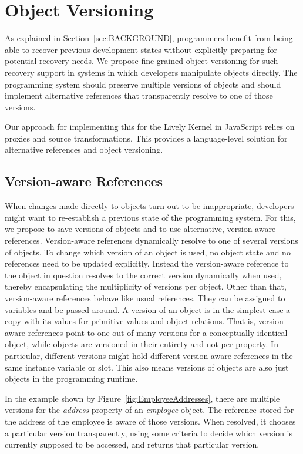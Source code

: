 \chapter{Object Versioning} \label{sec:APPROACH}

As explained in Section~\ref{sec:BACKGROUND}, programmers benefit from being able to recover previous development states without explicitly preparing for potential recovery needs.
We propose fine-grained object versioning for such recovery support in systems in which developers manipulate objects directly.
The programming system should preserve multiple versions of objects and should implement alternative references that transparently resolve to one of those versions.

Our approach for implementing this for the Lively Kernel in JavaScript relies on proxies and source transformations.
This provides a language-level solution for alternative references and object versioning.

\section{Version-aware References}

When changes made directly to objects turn out to be inappropriate, developers might want to re-establish a previous state of the programming system.
For this, we propose to save versions of objects and to use alternative, version-aware references.
Version-aware references dynamically resolve to one of several versions of objects.
To change which version of an object is used, no object state and no references need to be updated explicitly.
Instead the version-aware reference to the object in question resolves to the correct version dynamically when used, thereby encapsulating the multiplicity of versions per object.
Other than that, version-aware references behave like usual references.
They can be assigned to variables and be passed around.
A version of an object is in the simplest case a copy with its values for primitive values and object relations.
That is, version-aware references point to one out of many versions for a conceptually identical object, while objects are versioned in their entirety and not per property.
In particular, different versions might hold different version-aware references in the same instance variable or slot.
This also means versions of objects are also just objects in the programming runtime.

In the example shown by Figure~\ref{fig:EmployeeAddresses}, there are multiple versions for the \emph{address} property of an \emph{employee} object.
The reference stored for the address of the employee is aware of those versions.
When resolved, it chooses a particular version transparently, using some criteria to decide which version is currently supposed to be accessed, and returns that particular version.

